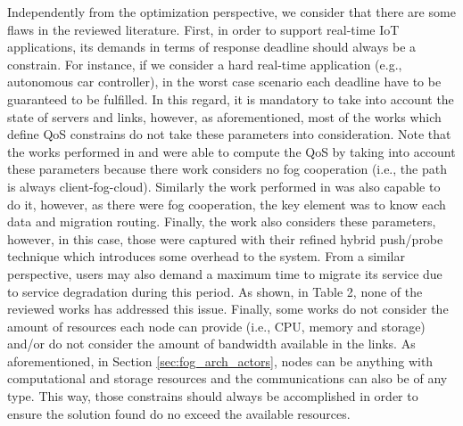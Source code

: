 \noindent\tab Independently from the optimization perspective, we consider that there are some flaws in the reviewed literature. First, in order to support real-time IoT applications, its demands in terms of response deadline should always be a constrain. For instance, if we consider a hard real-time application (e.g., autonomous car controller), in the worst case scenario each deadline have to be guaranteed to be fulfilled. In this regard, it is mandatory to take into account the state of servers and links, however, as aforementioned, most of the works which define QoS constrains do not take these parameters into consideration. Note that the works performed in \cite{deng2016optimal} and \cite{nan2017adaptive} were able to compute the QoS by taking into account these parameters because there work considers no fog cooperation (i.e., the path is always client-fog-cloud). Similarly the work performed in \cite{ottenwalder2013migcep} was also capable to do it, however, as there were fog cooperation, the key element was to know each data and migration routing. Finally, the work \cite{zhang2016segue} also considers these parameters, however, in this case, those were captured with their refined hybrid push/probe technique which introduces some overhead to the system.
From a similar perspective, users may also demand a maximum time to migrate its service due to service degradation during this period. As shown, in Table 2, none of the reviewed works has addressed this issue. Finally, some works do not consider the amount of resources each node can provide (i.e., CPU, memory and storage) and/or do not consider the amount of bandwidth available in the links. As aforementioned, in Section \ref{sec:fog_arch_actors}, nodes can be anything with computational and storage resources and the communications can also be of any type. This way, those constrains should always be accomplished in order to ensure the solution found do no exceed the available resources.\\
